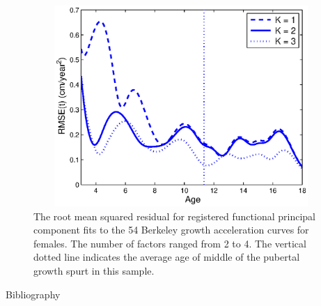 \documentclass[12pt]{article}
\begin{document}
\begin{figure}
  \includegraphics[height=3in, width=5in]{figs/Hfn_Reg_RMSE}
  \caption{The root mean squared residual for registered functional principal component fits to the 54 Berkeley growth acceleration curves for females.  The number of factors ranged from 2 to 4.  The vertical dotted line indicates the average age of middle of the pubertal growth spurt in this sample.}
  \label{RMSE_Reg}
\end{figure}


\newpage

\begin{center}
{\Large Bibliography}
\end{center}
\end{document}
